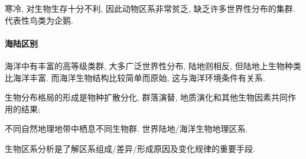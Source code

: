 \documentclass{ctexart}
\begin{document}
寒冷, 对生物生存十分不利, 因此动物区系非常贫乏, 缺乏许多世界性分布的集群. 代表性鸟类为企鹅.


\paragraph{海陆区别} %
\label{par:海陆区别}

海洋中有丰富的高等级类群, 大多广泛世界性分布, 陆地则相反, 但陆地上生物种类比海洋丰富. 而海洋生物结构比较简单而原始, 这与海洋环境条件有关系.




\begin{cenum}
    \item 生物分布格局的形成是物种扩散分化, 群落演替, 地质演化和其他生物因素共同作用的结果;
    \item 不同自然地理地带中栖息不同生物群. 世界陆地/海洋生物地理区系.
    \item 生物区系分析是了解区系组成/差异/形成原因及变化规律的重要手段.
\end{cenum}

\end{document}
